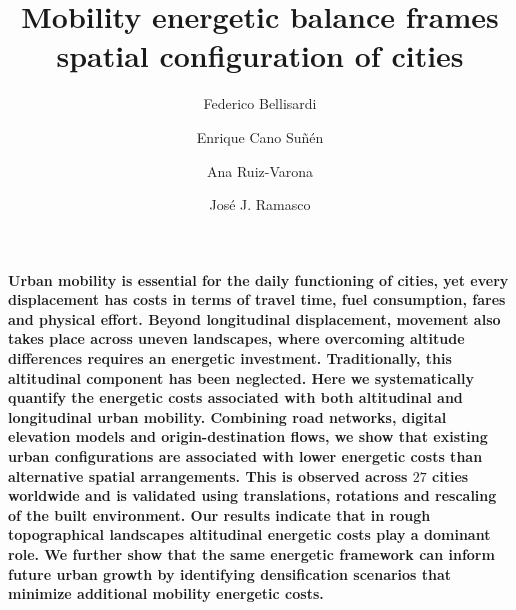 \documentclass[twocolumn,amsmath,amssymb,floatfix,nature,shownopacs,footinbib,superscriptaddress]{revtex4-2}
\begin{document}
\title{Mobility energetic balance frames spatial configuration of cities}

\author{Federico Bellisardi}

\author{Enrique Cano Su\~n\'en}

\author{Ana Ruiz-Varona}

\author{Jos\'e J. Ramasco}

\maketitle

{\bf Urban mobility is essential for the daily functioning of cities, yet every displacement has costs in terms of travel time, fuel consumption, fares and physical effort. Beyond longitudinal displacement, movement also takes place across uneven landscapes, where overcoming altitude differences requires an energetic investment. Traditionally, this altitudinal component has been neglected. Here we systematically quantify the energetic costs associated with both altitudinal and longitudinal urban mobility. Combining road networks, digital elevation models and origin-destination flows, we show that existing urban configurations are associated with lower energetic costs than alternative spatial arrangements. This is observed across $27$ cities worldwide and is validated using translations, rotations and rescaling of the built environment. Our results indicate that in rough topographical landscapes altitudinal energetic costs play a dominant role. We further show that the same energetic framework can inform future urban growth by identifying densification scenarios that minimize additional mobility energetic costs.}
\end{document}
